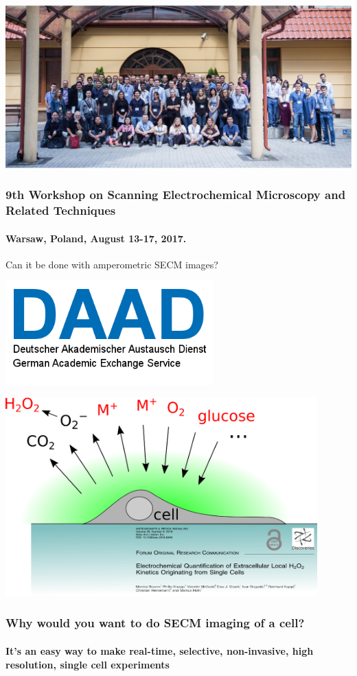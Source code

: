 \documentclass{beamer}
\begin{document}
\begin{frame}
	\centering
	\includegraphics[width=1\textwidth]{poland.eps}
	\frametitle{9th Workshop on Scanning Electrochemical Microscopy and Related Techniques}
	\framesubtitle{Warsaw, Poland, August 13-17, 2017.}
\end{frame}

\begin{frame}[plain]
\centering
Can it be done with amperometric SECM images?
\end{frame}

\begin{frame}[plain]
\centering
\includegraphics[width=0.6\textwidth]{daad.png}
\end{frame}

\begin{frame}
        \centering
        \includegraphics[width=0.9\textwidth]{cell.eps}
        \frametitle{Why would you want to do SECM imaging of a cell?}
	\framesubtitle{It's an easy way to make real-time, selective, non-invasive, high resolution, single cell experiments}
\end{frame}
\end{document}
